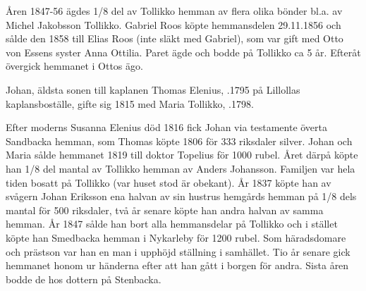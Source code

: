 Åren 1847-56 ägdes 1/8 del av Tollikko hemman av flera olika bönder bl.a. av Michel Jakobsson Tollikko. Gabriel Roos köpte hemmansdelen 29.11.1856 och sålde den 1858 till Elias Roos (inte släkt med Gabriel), som var gift med Otto von Essens syster Anna Ottilia. Paret ägde och bodde på Tollikko ca 5 år. Efteråt övergick hemmanet i Ottos ägo.


Johan, äldsta sonen till kaplanen Thomas Elenius, .1795 på Lillollas kaplansboställe, gifte sig 1815 med Maria Tollikko, .1798.
\begin{jhchildren}
  \item {}
  \item {}
  \item {}
  \item {}
  \item {}
  \item {}
  \item {}
  \item {}
\end{jhchildren}
Efter moderns Susanna Elenius död 1816 fick Johan via testamente överta Sandbacka hemman, som Thomas köpte 1806 för 333 riksdaler silver. Johan och Maria sålde hemmanet 1819 till doktor Topelius för 1000 rubel. Året därpå köpte han 1/8 del mantal av Tollikko hemman av Anders Johansson. Familjen var hela tiden bosatt på Tollikko (var huset stod är obekant). År 1837 köpte han av svågern Johan Eriksson ena halvan av sin hustrus hemgårds hemman på 1/8 dels mantal för 500 	riksdaler, två år senare köpte han andra halvan av samma hemman. År 1847 sålde han bort alla hemmansdelar på Tollikko och i stället köpte han Smedbacka hemman i Nykarleby för 1200 rubel. Som häradsdomare och prästson var han en man i upphöjd ställning i samhället. Tio år senare gick hemmanet honom ur händerna efter att han gått i borgen för andra. Sista åren bodde de hos dottern på Stenbacka.



